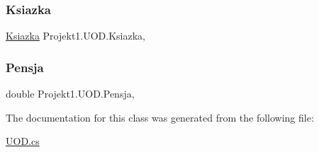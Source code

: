 \subsubsection{\texorpdfstring{Ksiazka}{Ksiazka}}
{\footnotesize\ttfamily \mbox{\hyperlink{class_projekt1_1_1_ksiazka}{Ksiazka}} Projekt1.\+U\+O\+D.\+Ksiazka\hspace{0.3cm}{\ttfamily [get]}, {}}

\mbox{\label{class_projekt1_1_1_u_o_d_a1a6c49dadfe79c56bd243332b2924b0b}} 
\subsubsection{\texorpdfstring{Pensja}{Pensja}}
{\footnotesize\ttfamily double Projekt1.\+U\+O\+D.\+Pensja\hspace{0.3cm}{\ttfamily [get]}, {}}



The documentation for this class was generated from the following file\+:\begin{DoxyCompactItemize}
\item 
\mbox{\hyperlink{_u_o_d_8cs}{U\+O\+D.\+cs}}\end{DoxyCompactItemize}

